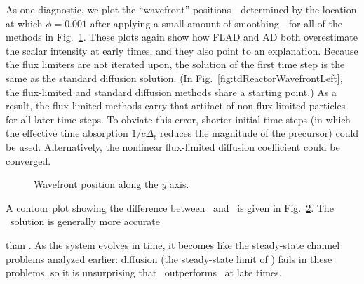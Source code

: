 As one diagnostic, we plot the ``wavefront'' positions---determined by the
location at which $\phi=0.001$ after applying a small amount of smoothing---for
all of the methods in Fig.~\ref{fig:tdReactorWavefront}. These plots again show
how FLAD and AD both overestimate the scalar intensity at early times, and they also
point to an explanation. Because the flux limiters are not iterated upon, the
solution of the first time step is the same as the standard diffusion
solution. (In Fig.~\ref{fig:tdReactorWavefrontLeft}, the flux-limited and
standard diffusion methods share a starting point.) As a result, the
flux-limited methods carry that artifact of non-flux-limited particles for all
later time steps. To obviate this error, shorter initial time steps (in which
the effective time absorption $1/c\Delta_t$ reduces the magnitude of the
precursor) could be used. Alternatively, the nonlinear flux-limited diffusion
coefficient could be converged.

\begin{figure}[htb]
  \centering\small
  \hspace{.25in}%
  \subfloat[Channel, $x=2.5$]{%
    \hspace{-.25in}%
    }
  \subfloat[Medium, $x=0$]{%
    \label{fig:tdReactorWavefrontLeft}%
    \hspace{-.25in}%
    }
  \caption{Wavefront position along the $y$ axis.}
  \label{fig:tdReactorWavefront}
\end{figure}

A contour plot showing the difference between \Pone\ and \APone\ is given in
Fig.~\ref{fig:tdReactorContour}. The \APone\ solution is generally more accurate
%
\begin{figure}[htb]
  \centering%



  \label{fig:tdReactorContour}
\end{figure}
%
than \Pone. As the system evolves in time, it becomes like the steady-state
channel problems analyzed earlier: diffusion (the steady-state limit of \Pone)
fails in these problems, so it is unsurprising that \APone\ outperforms \Pone\
at late times.

